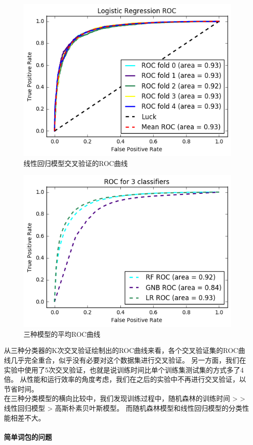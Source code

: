 \begin{figure}[p]
\centering
\includegraphics[width=0.9\linewidth]{lr_roc}
\caption[lr_roc]{线性回归模型交叉验证的ROC曲线}
\label{fig:lrroc}
\end{figure}

\begin{figure}[p]
\centering
\includegraphics[width=0.9\linewidth]{3c_roc}
\caption[3c_roc]{三种模型的平均ROC曲线}
\label{fig:3croc}
\end{figure}

从三种分类器的K次交叉验证绘制出的ROC曲线来看，各个交叉验证集的ROC曲线几乎完全重合，似乎没有必要对这个数据集进行交叉验证。
另一方面，我们在实验中使用了5次交叉验证，也就是说训练时间比单个训练集测试集的方式多了4倍。
从性能和运行效率的角度考虑，我们在之后的实验中不再进行交叉验证，以节省时间。\\
在三种分类模型的横向比较中，我们发现训练过程中，随机森林的训练时间 > > 线性回归模型 > 高斯朴素贝叶斯模型。
而随机森林模型和线性回归模型的分类性能相差不大。
\paragraph{简单词包的问题}